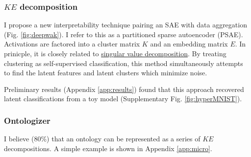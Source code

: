 \subsubsection{$KE$ decomposition}
I propose a new interpretability technique pairing an SAE with data aggregation 
(Fig. \ref{fig:deepwak}).
I refer to this as a partitioned sparse autoencoder (PSAE).
Activations are factored into a cluster matrix $K$ and an embedding matrix $E$.
In prinicple, it is closely related to 
\hyperlink{https://en.wikipedia.org/wiki/Singular_value_decomposition}{singular value decomposition}.
By treating clustering as self-supervised classification,
this method simultaneously attempts to find the latent features and
latent clusters which minimize noise.


Preliminary results (Appendix \ref{app:results}) found that this approach recovered latent classifications from a toy model 
(Supplementary Fig. \ref{fig:hyperMNIST}).

\subsubsection{Ontologizer}
I believe (80\%) that an ontology can be represented as a series of $KE$ decompositions.
A simple example is shown in Appendix \ref{app:micro}.
